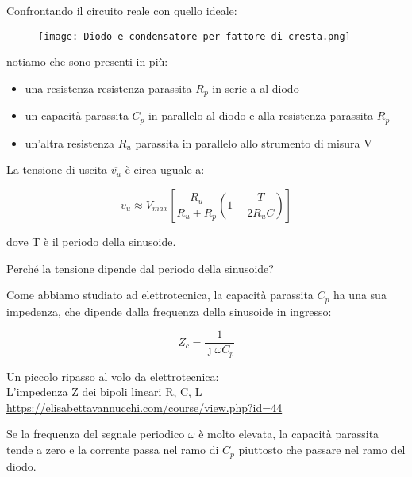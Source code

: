 Confrontando il circuito reale con quello ideale: 

\begin{figure}[h]
    \centering
    \texttt{[image: Diodo e condensatore per fattore di cresta.png]}
\end{figure}

notiamo che sono presenti in più: 

\begin{itemize}
    \item una resistenza resistenza parassita $R_p$ in serie a al diodo 
    \item un capacità parassita $C_p$ in parallelo al diodo e alla resistenza parassita $R_p$ 
    \item un'altra resistenza $R_u$ parassita in parallelo allo strumento di misura V
\end{itemize}

La tensione di uscita $\overline{v_u}$ è circa uguale a: 

{
    \Large 
    \begin{equation}
        \overline{v_u} 
        \approx 
        V_{max}
        \left[
            \frac{R_u}{R_u + R_p}
            \left(
                1 - 
                \frac{T}{2 R_u C} 
            \right)
        \right]
    \end{equation}
}

dove T è il periodo della sinusoide. \newline 

Perché la tensione dipende dal periodo della sinusoide? \newline 

Come abbiamo studiato ad elettrotecnica, 
la capacità parassita $C_p$ ha una sua impedenza, che dipende dalla frequenza della sinusoide in ingresso: 

{
    \Large 
    \begin{equation}
        Z_c = \frac{1}{\jmath \omega C_p}
    \end{equation}
}

\begin{tcolorbox}
    Un piccolo ripasso al volo da elettrotecnica: \\ 
    L'impedenza Z dei bipoli lineari R, C, L \\
    \url{https://elisabettavannucchi.com/course/view.php?id=44}
\end{tcolorbox}


Se la frequenza del segnale periodico $\omega$ è molto elevata, 
la capacità parassita tende a zero e la corrente passa nel ramo di $C_p$ piuttosto che passare nel ramo del diodo. \newline 

